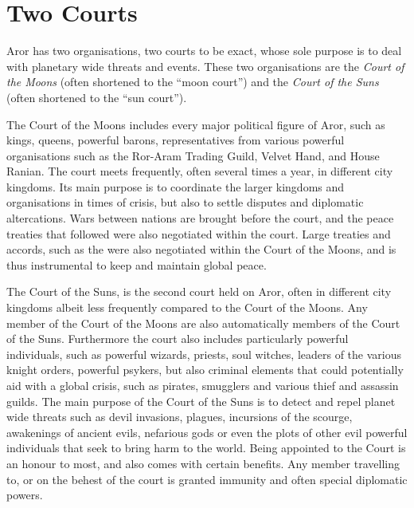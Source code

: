 \section{Two Courts}
\label{sec:Two Courts}

Aror has two organisations, two courts to be exact, whose sole purpose is to
deal with planetary wide threats and events. These two organisations are the
\emph{Court of the Moons} (often shortened to the ``moon court'') and the
\emph{Court of the Suns} (often shortened to the ``sun court'').

The Court of the Moons includes every major political figure of Aror, such
as kings, queens, powerful barons, representatives from various powerful
organisations such as the Ror-Aram Trading Guild, Velvet Hand, and House Ranian.
The court meets frequently, often several times a year, in different city
kingdoms. Its main purpose is to coordinate the larger kingdoms and
organisations in times of crisis, but also to settle disputes and diplomatic
altercations. Wars between nations are brought before the court, and the
peace treaties that followed were also negotiated within the court. Large
treaties and accords, such as the  were also
negotiated within the Court of the Moons, and is thus instrumental to keep
and maintain global peace.

The Court of the Suns, is the second court held on Aror, often in different
city kingdoms albeit less frequently compared to the Court of the Moons. Any
member of the Court of the Moons are also automatically members of the Court
of the Suns. Furthermore the court also includes particularly powerful
individuals, such as powerful wizards, priests, soul witches, leaders of the
various knight orders, powerful psykers, but also criminal elements that could
potentially aid with a global crisis, such as pirates, smugglers and various
thief and assassin guilds. The main purpose of the Court of the Suns is to
detect and repel planet wide threats such as devil invasions, plagues,
incursions of the scourge, awakenings of ancient evils, nefarious gods or even
the plots of other evil powerful individuals that seek to bring harm to the
world. Being appointed to the Court is an honour to most, and also comes with
certain benefits. Any member travelling to, or on the behest of the court is
granted immunity and often special diplomatic powers.

